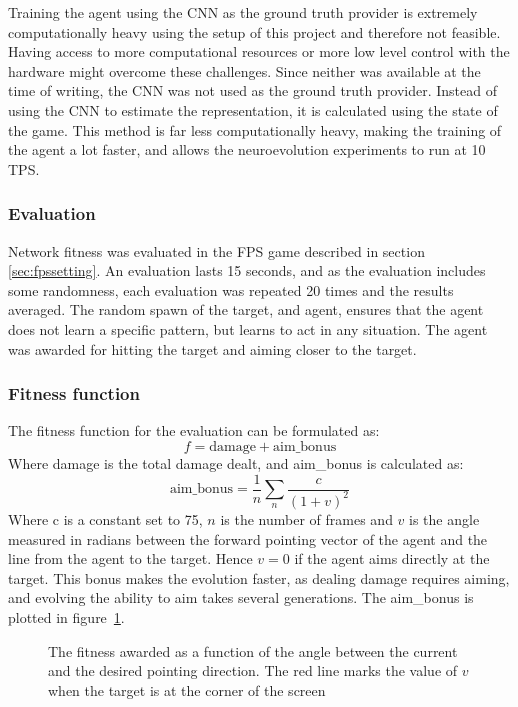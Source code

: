 Training the agent using the CNN as the ground truth provider is extremely computationally heavy using the setup of this project and therefore not feasible. Having access to more computational resources or more low level control with the hardware might overcome these challenges. Since neither was available at the time of writing, the CNN was not used as the ground truth provider. Instead of using the CNN to estimate the representation, it is calculated using the state of the game. This method is far less computationally heavy, making the training of the agent a lot faster, and allows the neuroevolution experiments to run at 10 TPS.

\subsubsection{Evaluation}
Network fitness was evaluated in the FPS game described in section \ref{sec:fpssetting}. An evaluation lasts 15 seconds, and as the evaluation includes some randomness, each evaluation was repeated 20 times and the results averaged. The random spawn of the target, and agent, ensures that the agent does not learn a specific pattern, but learns to act in any situation. The agent was awarded for hitting the target and aiming closer to the target.

\subsubsection{Fitness function}
The fitness function for the evaluation can be formulated as:
$$f = \text{damage} + \text{aim\_bonus}$$
Where damage is the total damage dealt, and aim\_bonus is calculated as:
$$ \text{aim\_bonus} = \frac{1}{n} \sum_{n} \frac{c}{(1+v)^2} $$
Where c is a constant set to 75, $n$ is the number of frames and $v$ is the angle measured in radians between the forward pointing vector of the agent and the line from the agent to the target. Hence $v = 0$ if the agent aims directly at the target. This bonus makes the evolution faster, as dealing damage requires aiming, and evolving the ability to aim takes several generations. The aim\_bonus is plotted in figure~\ref{fig:aim-bonus}.

\begin{figure}[h]
\centering
{}
\caption[Fitness function used for neuroevolution]{The fitness awarded as a function of the angle between the current and the desired pointing direction. The red line marks the value of $v$ when the target is at the corner of the screen}
\label{fig:aim-bonus}
\end{figure}

